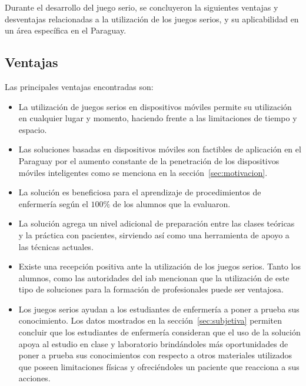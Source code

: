 Durante el desarrollo del juego serio, se concluyeron la siguientes ventajas y desventajas relacionadas a la utilización de los juegos serios, y su aplicabilidad en un área específica en el Paraguay.

\subsection{Ventajas}

Las principales ventajas encontradas son:

\begin{itemize}

\item La utilización de juegos serios en dispositivos móviles permite su utilización en cualquier lugar y momento, haciendo frente a las limitaciones de tiempo y espacio.

\item Las soluciones basadas en dispositivos móviles son factibles de aplicación en el Paraguay por el aumento constante de la penetración de los dispositivos móviles inteligentes como se menciona en la sección~\ref{sec:motivacion}.

\item La solución es beneficiosa para el aprendizaje de procedimientos de enfermería según el $100\%$ de los alumnos que la evaluaron.

\item La solución agrega un nivel adicional de preparación entre las clases teóricas y la práctica con pacientes, sirviendo así como una herramienta de apoyo a las técnicas actuales.

\item Existe una recepción positiva ante la utilización de los juegos serios. Tanto los alumnos, como las autoridades del \gls{iab} mencionan que la utilización de este tipo de soluciones para la formación de profesionales puede ser ventajosa.

\item Los juegos serios ayudan a los estudiantes de enfermería a poner a prueba sus conocimiento. Los datos mostrados en la sección~\ref{sec:subjetiva} permiten concluir que los estudiantes de enfermería consideran que el uso de la solución apoya al estudio en clase y laboratorio brindándoles más oportunidades de poner a prueba sus conocimientos con respecto a otros materiales utilizados que poseen limitaciones físicas y ofreciéndoles un paciente que reacciona a sus acciones.

\end{itemize}

